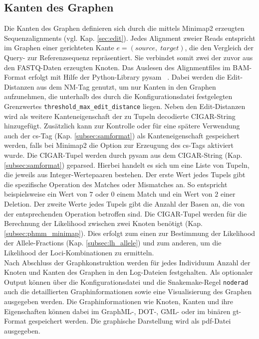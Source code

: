 \subsection{Kanten des Graphen} \label{subsec:edges}
Die Kanten des Graphen definieren sich durch die mittels Minimap2 erzeugten Sequenzalignments (vgl. Kap. \ref{sec:edit}). Jedes Alignment zweier Reads entspricht im Graphen einer gerichteten Kante $e = (source,\; target)$, die den Vergleich der Query- zur Referenzsequenz repräsentiert. Sie verbindet somit zwei der zuvor aus den FASTQ-Daten erzeugten Knoten. Das Auslesen des Alignmentfiles im BAM-Format erfolgt mit Hilfe der Python-Library pysam ~\cite{pysam}. Dabei werden die Edit-Distanzen aus dem NM-Tag genutzt, um nur Kanten in den Graphen aufzunehmen, die unterhalb des durch die Konfigurationsdatei festgelegten Grenzwertes \lstinline|threshold_max_edit_distance| liegen. Neben den Edit-Distanzen wird als weitere Kanteneigenschaft der zu Tupeln decodierte CIGAR-String hinzugefügt. Zusätzlich kann zur Kontrolle oder für eine spätere Verwendung auch der cs-Tag (Kap. \ref{subsec:samformat}) als Kanteneigenschaft gespeichert werden, falls bei Minimap2 die Option zur Erzeugung des cs-Tags aktiviert wurde. Die CIGAR-Tupel werden durch pysam aus dem CIGAR-String (Kap. \ref{subsec:samformat}) geparsed. Hierbei handelt es sich um eine Liste von Tupeln, die jeweils aus Integer-Wertepaaren bestehen. Der erste Wert jedes Tupels gibt die spezifische Operation des Matches oder Mismatches an. So entspricht beispielsweise ein Wert von $ 7 $ oder $ 0 $ einem Match und ein Wert von $ 2 $ einer Deletion. Der zweite Werte jedes Tupels gibt die Anzahl der Basen an, die von der entsprechenden Operation betroffen sind. Die CIGAR-Tupel werden für die Berechnung der Likelihood zwischen zwei Knoten benötigt (Kap. \ref{subsec:phmm_minimap}). Dies erfolgt zum einen zur Bestimmung der Likelihood der Allele-Fractions (Kap. \ref{subsec:lh_allele}) und zum anderen, um die Likelihood der Loci-Kombinationen zu ermitteln. \\

Nach Abschluss der Graphkonstruktion werden für jedes Individuum Anzahl der Knoten und Kanten des Graphen in den Log-Dateien festgehalten. Als optionaler Output können über die Konfigurationsdatei und die Snakemake-Regel \lstinline|noderad| auch die detaillierten Graphinformationen sowie eine Visualisierung des Graphen ausgegeben werden. Die Graphinformationen wie Knoten, Kanten und ihre Eigenschaften können dabei im GraphML-, DOT-, GML- oder im binären gt-Format gespeichert werden. Die graphische Darstellung wird als pdf-Datei ausgegeben. \\

